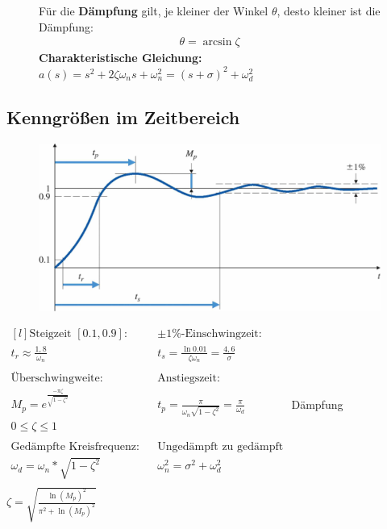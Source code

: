 \begin{tcolorbox}[colback=white!10!white,
                  colframe=green!30!black,
                  title=PT$_2$ - Glied]
\begin{figure}[H]
\begin{minipage}{.65\textwidth}
            Für die  \textbf{Dämpfung} gilt, je kleiner der Winkel $\theta$, 
            desto kleiner ist die Dämpfung:
            \begin{align*}
                \theta = \arcsin{\zeta}
            \end{align*}
            \textbf{Charakteristische Gleichung:} \\
            $a(s) = s^2 + 2\zeta\omega_ns + \omega_n^2
                  = \left(s+\sigma\right)^2 + \omega_d^2$
        \end{minipage}%
    \end{figure}
\end{tcolorbox}

\subsection{Kenngrößen im Zeitbereich}
\begin{tcolorbox}[colback=white!10!white,
                  colframe=green!30!black,
                  title=Kenngrößen] 
    \begin{figure}[H]
        \includegraphics[width=1\linewidth]{images/numb}
    \end{figure}
    $\begin{matrix*}[l]
        \text{Steigzeit }[0.1, 0.9]\text{:}
            && \pm 1\%\text{-Einschwingzeit:} \\
        t_r \approx \frac{1,8}{\omega_n}
            && t_s = \frac{\ln{0.01}}{\zeta\omega_n} = \frac{4,6}{\sigma} \\\\
        \text{Überschwingweite:}
            && \text{Anstiegszeit:} \\
        M_p = e^{\frac{-\pi \zeta}{\sqrt{1-\zeta^2}}}
            && t_p = \frac{\pi}{\omega_n \sqrt{1-\zeta^2}} =\frac{\pi}{\omega_d} \\
            0 \leq \zeta \leq 1 \\\\
        \text{Gedämpfte Kreisfrequenz:}
            && \text{Ungedämpft zu gedämpft} \\
        \omega_d = \omega_n*\sqrt{1-\zeta^2}
            && \omega_n^2 = \sigma^2+\omega_d^2 \\
    \end{matrix*}$
    Dämpfung $\zeta = \sqrt{\frac{\ln(M_p)^2}{\pi^2+\ln(M_p)^2}}$
\end{tcolorbox}

